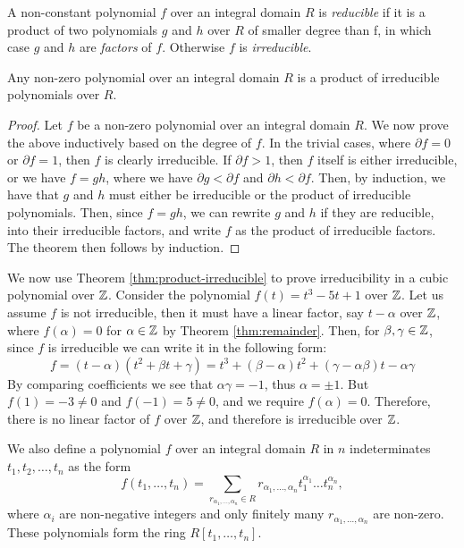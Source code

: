 \begin{definition}
     A non-constant polynomial $f$ over an integral domain $R$ is \textit{reducible} if it is a product of two polynomials $g$ and $h$ over $R$ of smaller degree than f, in which case $g$ and $h$ are \textit{factors} of $f$. Otherwise $f$ is \textit{irreducible}. 
\end{definition}

\begin{theorem} \label{thm:product-irreducible}
    Any non-zero polynomial over an integral domain $R$ is a product of irreducible polynomials over $R$.
\end{theorem}

\begin{proof}
    Let $f$ be a non-zero polynomial over an integral domain $R$. We now prove the above inductively based on the degree of $f$. In the trivial cases, where $\partial f =0$ or $\partial f = 1$, then $f$ is clearly irreducible. If $\partial f > 1$, then $f$ itself is either irreducible, or we have $f=gh$, where we have $\partial g < \partial f$ and $\partial h < \partial f$. Then, by induction, we have that $g$ and $h$ must either be irreducible or the product of irreducible polynomials. Then, since $f=gh$, we can rewrite $g$ and $h$ if they are reducible, into their irreducible factors, and write $f$ as the product of irreducible factors. The theorem then follows by induction. 
\end{proof}

\begin{example}
    We now use Theorem \ref{thm:product-irreducible} to prove irreducibility in a cubic polynomial over $\mathbb Z$. Consider the polynomial $f(t)=t^3-5t+1$ over $\mathbb Z$. Let us assume $f$ is not irreducible, then it must have a linear factor, say $t-\alpha$ over $\mathbb Z$, where $f(\alpha)=0$ for $\alpha \in \mathbb Z$ by Theorem \ref{thm:remainder}. Then, for $\beta, \gamma \in \mathbb Z$, since $f$ is irreducible we can write it in the following form:
    $$f=(t-\alpha)(t^2+\beta t + \gamma) = t^3 + (\beta - \alpha)t^2 + (\gamma - \alpha \beta)t - \alpha \gamma$$
    By comparing coefficients we see that $\alpha \gamma = -1$, thus $\alpha = \pm 1$. But $f(1) = -3 \neq 0$ and $f(-1) = 5 \neq 0$, and we require $f(\alpha)=0$. Therefore, there is no linear factor of $f$ over $\mathbb Z$, and therefore is irreducible over $\mathbb Z$.
\end{example}

We also define a polynomial $f$ over an integral domain $R$ in $n$ indeterminates $t_1, t_2, \dots, t_n$ as the form 
$$
f(t_1, \dots, t_n) = \sum _{ r_{\alpha_1, \dots, \alpha_n} \in R}  r_{\alpha_1, \dots, \alpha_n} t_1^{\alpha_1} \dots t_n ^{\alpha_n},
$$
where $\alpha_i$ are non-negative integers and only finitely many $r_{\alpha_1, \dots, \alpha_n}$ are non-zero. These polynomials form the ring $R[t_1, \dots, t_n]$.

